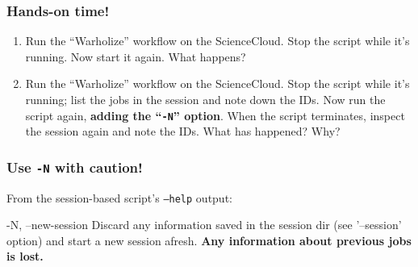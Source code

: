 \documentclass[english,serif,mathserif,usenames,dvipsnames]{beamer}
\begin{document}
\begin{frame}
  \frametitle{Hands-on time!}

    \begin{exercise}
      \begin{enumerate}
      \item Run the ``Warholize'' workflow on the ScienceCloud.  Stop
        the script while it's running.  Now start it again.  What
        happens?

      \item Run the ``Warholize'' workflow on the ScienceCloud.  Stop
        the script while it's running; list the jobs in the session
        and note down the IDs.  Now run the script again,
        \textbf{adding the ``\texttt{-N}'' option}.  When the script
        terminates, inspect the session again and note the IDs. What has
        happened? Why?
      \end{enumerate}
    \end{exercise}
\end{frame}


\begin{frame}[fragile]
  \frametitle{Use \texttt{-N} with caution!}

  \small
  From the session-based script's \texttt{--help} output:
\begin{semiverbatim}
-N, --new-session
  Discard any information saved in the session dir
  (see '--session' option) and start a new session
  afresh. {\bf Any information about previous jobs is lost.}
\end{semiverbatim}

\end{frame}





\end{document}
